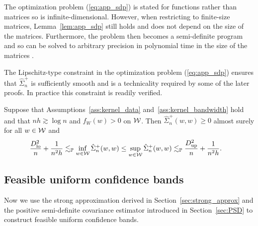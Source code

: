 \begin{remark}

  The optimization problem (\ref{eq:app_sdp}) is stated for functions
  rather than matrices so is infinite-dimensional.
  However, when restricting to finite-size matrices,
  Lemma~\ref{lem:app_sdp} still holds and does not depend on
  the size of the matrices.
  Furthermore, the problem
  then becomes a semi-definite program and so can be solved to
  arbitrary precision in polynomial time
  in the size of the matrices
  \citep{laurent2005semidefinite}.

  The Lipschitz-type constraint in the
  optimization problem (\ref{eq:app_sdp})
  ensures that $\hat \Sigma_n^+$
  is sufficiently smooth
  and is a technicality required by
  some of the later proofs.
  In practice this constraint is readily verified.

\end{remark}

\begin{lemma}
  \label{lem:variance_estimator_bounds}

  Suppose that Assumptions~\ref{ass:kernel_data}
  and~\ref{ass:kernel_bandwidth} hold and that
  $n h \gtrsim \log n$ and $f_W(w) > 0$ on $\mathcal{W}$.
  Then $\hat \Sigma_n^+(w,w) \geq 0$
  almost surely for all $w \in \mathcal{W}$ and
  \begin{align*}
    \frac{D_{\textup{lo}}^2}{n} + \frac{1}{n^2h}
    &\lesssim_{\mathbb{P}}
    \inf_{w \in \mathcal{W}} \hat \Sigma_n^+(w,w)
    \leq
    \sup_{w \in \mathcal{W}} \hat \Sigma_n^+(w,w)
    \lesssim_{\mathbb{P}}
    \frac{D_{\textup{up}}^2}{n} + \frac{1}{n^2h}.
  \end{align*}

\end{lemma}

\subsection{Feasible uniform confidence bands}
\label{sec:app_feasible_confidence_bands}

Now we use the strong approximation derived in
Section~\ref{sec:strong_approx} and the
positive semi-definite covariance estimator introduced in
Section~\ref{sec:PSD} to construct feasible uniform confidence bands.

